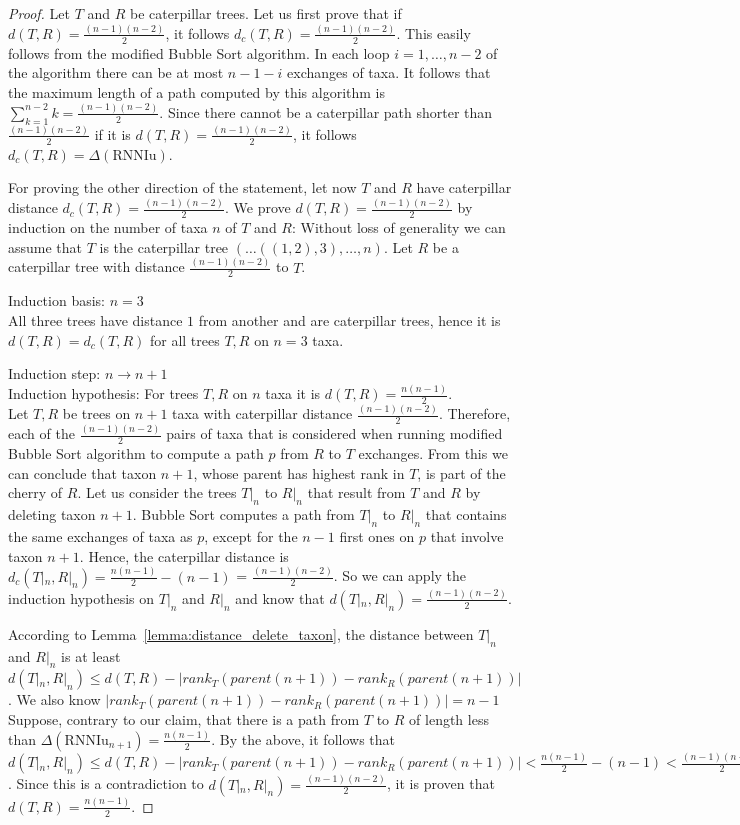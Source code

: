 \documentclass[11pt, a4paper]{article}
\newcommand{\rnniu}{\mathrm{RNNIu}}
\begin{document}
\begin{proof}
    Let $T$ and $R$ be caterpillar trees.
    Let us first prove that if $d(T,R) = \frac{(n-1)(n-2)}{2}$, it follows $d_c(T,R) = \frac{(n-1)(n-2)}{2}$.
    This easily follows from the modified Bubble Sort algorithm. 
    In each loop $i=1, \ldots, n-2$ of the algorithm there can be at most $n-1-i$ exchanges of taxa.
    It follows that the maximum length of a path computed by this algorithm is $\sum\limits_{k=1}^{n-2} k = \frac{(n-1)(n-2)}{2}$.
    Since there cannot be a caterpillar path shorter than $\frac{(n-1)(n-2)}{2}$ if it is $d(T,R) = \frac{(n-1)(n-2)}{2}$, it follows $d_c(T,R) = \Delta(\rnniu)$.

    For proving the other direction of the statement, let now $T$ and $R$ have caterpillar distance $d_c(T,R) =  \frac{(n-1)(n-2)}{2}$.
    We prove $d(T,R) = \frac{(n-1)(n-2)}{2}$ by induction on the number of taxa $n$ of $T$ and $R$:
    Without loss of generality we can assume that $T$ is the caterpillar tree $(\ldots ((1,2),3), \ldots, n)$.
    Let $R$ be a caterpillar tree with distance $\frac{(n-1)(n-2)}{2}$ to $T$.

    Induction basis: $n=3$\\
    All three trees have distance $1$ from another and are caterpillar trees, hence it is $d(T,R) = d_c(T,R)$ for all trees $T,R$ on $n=3$ taxa.

    Induction step: $n \to n+1$\\
    Induction hypothesis: For trees $T, R$ on $n$ taxa it is $d(T, R) = \frac{n(n-1)}{2}$.\\
    Let $T, R$ be trees on $n+1$ taxa with caterpillar distance $\frac{(n-1)(n-2)}{2}$.
    Therefore, each of the $\frac{(n-1)(n-2)}{2}$ pairs of taxa that is considered when running modified Bubble Sort algorithm  to compute a path $p$ from $R$ to $T$ exchanges.
    From this we can conclude that taxon $n+1$, whose parent has highest rank in $T$, is part of the cherry of $R$.
    Let us consider the trees $T|_n$ to $R|_n$ that result from $T$ and $R$ by deleting taxon $n+1$.
    Bubble Sort  computes a path from $T|_n$ to $R|_n$ that contains the same exchanges of taxa as $p$, except for the $n-1$ first ones on $p$ that involve taxon $n+1$.
    Hence, the caterpillar distance is $d_c(T|_n, R|_n) = \frac{n(n-1)}{2} - (n-1)$ = $\frac{(n-1)(n-2)}{2}$.
    So we can apply the induction hypothesis on $T|_n$ and $R|_n$ and know that $d(T|_n,R|_n) = \frac{(n-1)(n-2)}{2}$.

    According to Lemma~\ref{lemma:distance_delete_taxon}, the distance between $T|_n$ and $R|_n$ is at least $d(T|_n, R|_n) \leq d(T,R) - |rank_T(parent(n+1)) - rank_R(parent(n+1))|$.
    We also know $|rank_T(parent(n+1)) - rank_R(parent(n+1))| = n-1$
    Suppose, contrary to our claim, that there is a path from $T$ to $R$ of length less than $\Delta(\rnniu_{n+1}) = \frac{n(n-1)}{2}$.
    By the above, it follows that $d(T|_n, R|_n) \leq d(T,R) - |rank_T(parent(n+1)) - rank_R(parent(n+1))| < \frac{n(n-1)}{2} - (n-1) < \frac{(n-1)(n-2)}{2}$.
    Since this is a contradiction to $d(T|_n, R|_n) = \frac{(n-1)(n-2)}{2}$, it is proven that $d(T,R) = \frac{n(n-1)}{2} $.

\end{proof}
\end{document}
